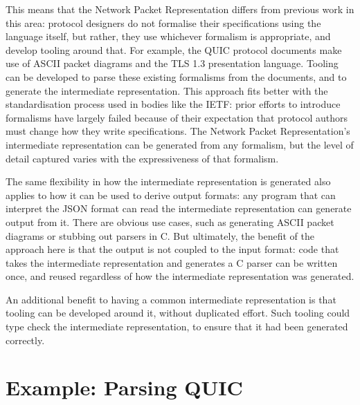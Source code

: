 \documentclass[10pt,sigconf]{acmart}
\begin{document}
This means that the Network Packet Representation differs from previous work in this area:
protocol designers do not formalise their specifications using the language itself, but
rather, they use whichever formalism is appropriate, and develop tooling around that. For
example, the QUIC protocol documents make use of ASCII packet diagrams and the TLS 1.3
presentation language. Tooling can be developed to parse these existing formalisms from
the documents, and to generate the intermediate representation. This approach fits better
with the standardisation process used in bodies like the IETF: prior efforts to introduce
formalisms have largely failed because of their expectation that protocol authors must
change how they write specifications. The Network Packet Representation's intermediate
representation can be generated from any formalism, but the level of detail captured
varies with the expressiveness of that formalism.

The same flexibility in how the intermediate representation is generated also applies to
how it can be used to derive output formats: any program that can interpret the JSON
format can read the intermediate representation can generate output from it. There are
obvious use cases, such as generating ASCII packet diagrams or stubbing out parsers in C.
But ultimately, the benefit of the approach here is that the output is not coupled to the
input format: code that takes the intermediate representation and generates a C parser can
be written once, and reused regardless of how the intermediate representation was
generated.

An additional benefit to having a common intermediate representation is that tooling can
be developed around it, without duplicated effort. Such tooling could type check the
intermediate representation, to ensure that it had been generated correctly.

\section{Example: Parsing QUIC}
\label{sec:casestudy}
\end{document}
